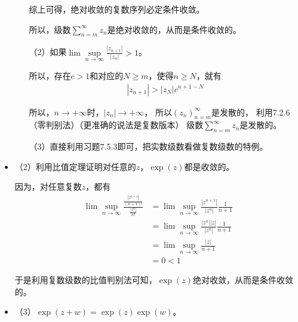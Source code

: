 \documentclass{article}
\begin{document}
\begin{itemize}
\begin{itemize}
                综上可得，绝对收敛的复数序列必定条件收敛。

                所以，级数$\sum\limits_{n = m}^\infty z_n$是绝对收敛的，从而是条件收敛的。


                （2）如果$\lim\sup\limits_{n \to \infty} \frac{|z_{n + 1}|}{|z_n|} > 1$。

                所以，存在$c > 1$和对应的$N \geq m$，使得$n \geq N$，就有
                \begin{align*}
                  |z_{n + 1}| > |z_N|c^{n + 1 - N}
                \end{align*}

                所以，$n \to +\infty$时，$|z_n| \to +\infty$，
                所以$(z_n)_{n = m}^\infty$是发散的，
                利用7.2.6（零判别法）（更准确的说法是复数版本）
                级数$\sum\limits_{n = m}^\infty z_n$是发散的。

                （3）直接利用习题7.5.3即可，把实数级数看做复数级数的特例。
        \end{itemize}

  \item （2）利用比值定理证明对任意的$z$，$\exp(z)$都是收敛的。

        因为，对任意复数$z$，都有
        \begin{align*}
          \lim\sup\limits_{n \to \infty}\frac{\frac{|z^{n+1}|}{(n+1)!}}{\frac{|z^{n}|}{n!}}
           & = \lim\sup\limits_{n \to \infty}\frac{|z^{n+1}|}{|z^{n}|} \frac{1}{n+1} \\
           & = \lim\sup\limits_{n \to \infty}\frac{|z^{n}||z|}{|z^{n}|}\frac{1}{n+1} \\
           & = \lim\sup\limits_{n \to \infty}\frac{|z|}{n + 1}                       \\
           & = 0 < 1
        \end{align*}

        于是利用复数级数的比值判别法可知，$\exp(z)$绝对收敛，从而是条件收敛的。

  \item （3）$\exp(z + w) = \exp(z) \exp(w)$。

  
\end{itemize}
\end{document}
